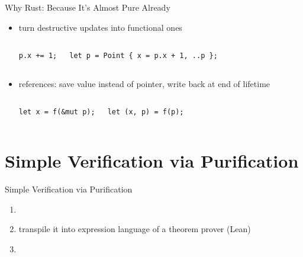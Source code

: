 \documentclass{beamer}
\begin{document}
\begin{frame}[fragile]{Why Rust: Because It's Almost Pure Already}
  \begin{itemize}
    \item turn destructive updates into functional ones
      \begin{columns}
        \color{gray}
        \begin{verbatim}
p.x += 1;
        \end{verbatim}
        \begin{verbatim}
let p = Point { x = p.x + 1, ..p };
        \end{verbatim}
      \end{columns}
    \item references: save value instead of pointer, write back at end of lifetime
      \begin{columns}
        \color{gray}
        \begin{verbatim}
let x = f(&mut p);
        \end{verbatim}
        \begin{verbatim}
let (x, p) = f(p);
        \end{verbatim}
      \end{columns}
  \end{itemize}
\end{frame}

\section{Simple Verification via Purification}

\begin{frame}[t]{Simple Verification via Purification}
  \begin{enumerate}
    \item {}
    \item transpile it into expression language of a theorem prover (Lean)
    \item {}
  \end{enumerate}
\end{frame}
\end{document}
